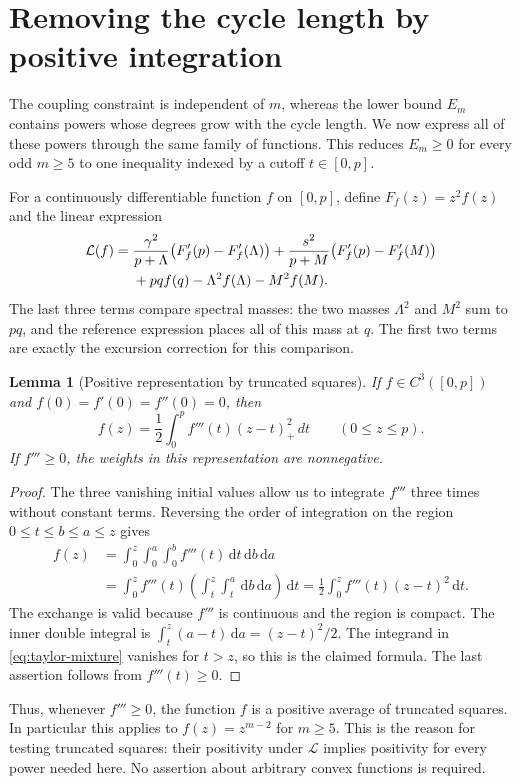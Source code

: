 \documentclass[11pt]{article}
\numberwithin{equation}{section}
\newtheorem{lemma}[theorem]{Lemma}
\newcommand{\dd}{\,\mathrm d}
\begin{document}
\section{Removing the cycle length by positive integration}\label{sec:integration}
The coupling constraint is independent of $m$, whereas the lower
bound $E_m$ contains powers whose degrees grow with the cycle
length. We now express all of these powers through the same family
of functions. This reduces $E_m\ge0$ for every odd $m\ge5$ to
one inequality indexed by a cutoff $t\in[0,p]$.

For a continuously differentiable function $f$ on $[0,p]$, define
$F_f(z)=z^2f(z)$ and the linear expression
\begin{align}\label{eq:moment-functional}
 \mathcal L(f)={}&\frac{\gamma^2}{p+\Lambda}
       \bigl(F_f'(p)-F_f'(\Lambda)\bigr)
 +\frac{s^2}{p+M}\bigl(F_f'(p)-F_f'(M)\bigr)\notag\\
 &+pq f(q)-\Lambda^2 f(\Lambda)-M^2 f(M).
\end{align}
The last three terms compare spectral masses: the two masses
$\Lambda^2$ and $M^2$ sum to $pq$, and the reference expression
places all of this mass at $q$. The first two terms are exactly
the excursion correction for this comparison.

\begin{lemma}[Positive representation by truncated squares]\label{lem:taylor-mixture}
If $f\in C^3([0,p])$ and $f(0)=f'(0)=f''(0)=0$, then
\begin{equation}\label{eq:taylor-mixture}
 f(z)=\frac12\int_0^p f'''(t)(z-t)_+^2\,dt
 \qquad(0\le z\le p).
\end{equation}
If $f'''\ge0$, the weights in this representation are nonnegative.
\end{lemma}
\begin{proof}
The three vanishing initial values allow us to integrate $f'''$
three times without constant terms. Reversing the order of integration
on the region $0\le t\le b\le a\le z$ gives
\begin{align*}
 f(z)&=\int_0^z\int_0^a\int_0^b f'''(t)\dd t\dd b\dd a\\
 &=\int_0^z f'''(t)
       \left(\int_t^z\int_t^a\dd b\dd a\right)\dd t
  =\frac12\int_0^z f'''(t)(z-t)^2\dd t.
\end{align*}
The exchange is valid because $f'''$ is continuous and the region
is compact. The inner double integral is
$\int_t^z(a-t)\dd a=(z-t)^2/2$.
The integrand in \eqref{eq:taylor-mixture} vanishes for $t>z$,
so this is the claimed formula. The last assertion follows from
$f'''(t)\ge0$.
\end{proof}
Thus, whenever $f'''\ge0$, the function $f$ is a positive average of
truncated squares. In particular this applies to $f(z)=z^{m-2}$
for $m\ge5$. This is the reason for testing truncated squares:
their positivity under $\mathcal L$ implies positivity for every
power needed here. No assertion about arbitrary convex functions
is required.
\end{document}
